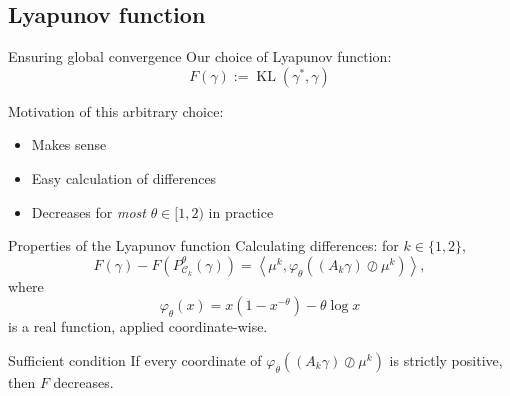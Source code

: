 \documentclass[compress]{beamer}
\newcommand{\scal}[2]{\left\langle #1 , #2 \right\rangle}
\DeclareMathOperator{\Ccal}{\mathcal{C}}
\DeclareMathOperator{\KL}{KL}
\begin{document}
\subsection{Lyapunov function}
\begin{frame}{Ensuring global convergence}
	Our choice of Lyapunov function:
	\[F(\gamma) := \KL(\gamma^*,\gamma)\]
	\pause
	
	Motivation of this arbitrary choice:
	\begin{itemize}
		\item Makes sense
		\item Easy calculation of differences %
		\item Decreases for \emph{most} $\theta \in [1,2)$ in practice %
	\end{itemize}
	
\end{frame}

\begin{frame}{Properties of the Lyapunov function}
Calculating differences: for $k \in \{1,2\}$,
\begin{equation*} \label{eq:kl_diff_scal}
F(\gamma) - F(P^\theta_{\Ccal_k}(\gamma)) = 
\scal{\mu^k}{\varphi_\theta \left((A_k \gamma) \oslash \mu^k \right)},
\end{equation*}
where
\begin{equation*}
\varphi_\theta(x) = x(1-x^{-\theta}) - \theta \log x
\end{equation*}
is a real function, applied coordinate-wise.
\pause
\begin{block}{Sufficient condition}
	If every coordinate of $\varphi_\theta \left((A_k \gamma) \oslash \mu^k \right)$ is strictly positive, then $F$ decreases.
\end{block}
\end{frame}
\end{document}
